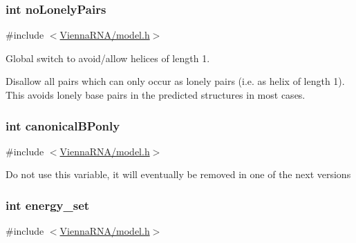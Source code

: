 \subsubsection[{\texorpdfstring{no\+Lonely\+Pairs}{noLonelyPairs}}]{\setlength{\rightskip}{0pt plus 5cm}int no\+Lonely\+Pairs}\hypertarget{group__model__details_ga097eccaabd6ae8b4fef83cccff85bb5d}{}\label{group__model__details_ga097eccaabd6ae8b4fef83cccff85bb5d}


{\ttfamily \#include $<$\hyperlink{model_8h}{Vienna\+R\+N\+A/model.\+h}$>$}



Global switch to avoid/allow helices of length 1. 

Disallow all pairs which can only occur as lonely pairs (i.\+e. as helix of length 1). This avoids lonely base pairs in the predicted structures in most cases. 
\subsubsection[{\texorpdfstring{canonical\+B\+Ponly}{canonicalBPonly}}]{\setlength{\rightskip}{0pt plus 5cm}int canonical\+B\+Ponly}\hypertarget{group__model__details_ga22ae821b8918930e20ffa3fa84802b4b}{}\label{group__model__details_ga22ae821b8918930e20ffa3fa84802b4b}


{\ttfamily \#include $<$\hyperlink{model_8h}{Vienna\+R\+N\+A/model.\+h}$>$}

Do not use this variable, it will eventually be removed in one of the next versions 
\subsubsection[{\texorpdfstring{energy\+\_\+set}{energy_set}}]{\setlength{\rightskip}{0pt plus 5cm}int energy\+\_\+set}\hypertarget{group__model__details_gafb1ef1166da85092ae8a325e02dcae71}{}\label{group__model__details_gafb1ef1166da85092ae8a325e02dcae71}


{\ttfamily \#include $<$\hyperlink{model_8h}{Vienna\+R\+N\+A/model.\+h}$>$}



